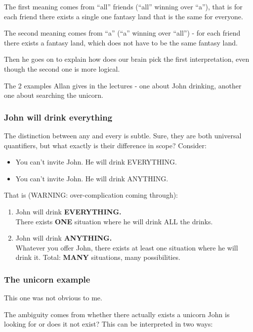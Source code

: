 The first meaning comes from ``all'' friends (``all'' winning over ``a''), that
is for each friend there exists a single one fantasy land that is the same for
everyone.

The second meaning comes from ``a'' (``a'' winning over ``all'') - for each
friend there exists a fantasy land, which does not have to be the same fantasy
land.

Then he goes on to explain how does our brain pick the first interpretation,
even though the second one is more logical.


The 2 examples Allan gives in the lectures - one about John drinking, another 
one about searching the unicorn.

\subsubsection{John will drink everything}
The distinction between any and every is subtle. Sure, they are both universal
quantifiers, but what exactly is their difference in scope? Consider:

\begin{itemize}
	\item You can't invite John. He will drink EVERYTHING.
	\item You can't invite John. He will drink ANYTHING.
\end{itemize}

That is (WARNING: over-complication coming through):

\begin{enumerate}
	\item John will drink \textbf{EVERYTHING.}\\ There exists \textbf{ONE} 
	situation where he will drink ALL the drinks.
	\item John will drink \textbf{ANYTHING.}\\ Whatever you offer John, there 
	exists at least one situation where he will drink it. Total: \textbf{MANY} 
	situations, many possibilities. 
\end{enumerate}

\subsubsection{The unicorn example}
This one was not obvious to me.

The ambiguity comes from whether there actually exists a unicorn John is looking
for or does it not exist? This can be interpreted in two ways:

